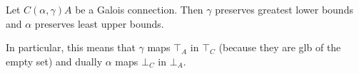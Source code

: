 %	
%	

\begin{prop}\label{ch2:th:gc-adjoints-preserve-glb-lub}
	Let $C (\alpha, \gamma) A$ be a Galois connection. Then $\gamma$ preserves greatest lower bounds and $\alpha$ preserves least upper bounds.
\end{prop}
%	
In particular, this means that $\gamma$ maps $\top_A$ in $\top_C$ (because they are glb of the empty set) and dually $\alpha$ maps $\bot_C$ in $\bot_A$.


